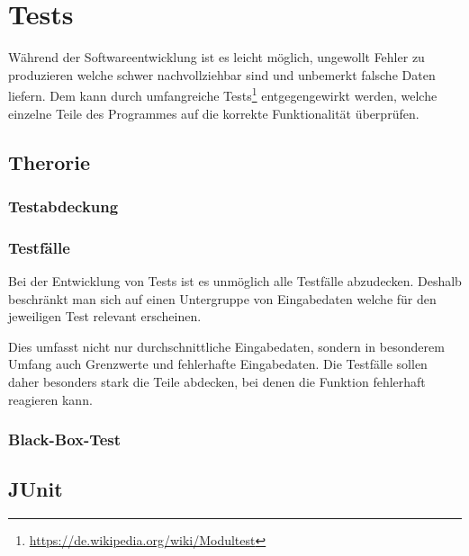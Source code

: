 

\section{Tests}

W\"ahrend der Softwareentwicklung ist es leicht m\"oglich, ungewollt Fehler zu produzieren welche schwer nachvollziehbar sind und unbemerkt falsche Daten liefern. Dem kann durch umfangreiche Tests\footnote{\url{https://de.wikipedia.org/wiki/Modultest}} entgegengewirkt werden, welche einzelne Teile des Programmes auf die korrekte Funktionalit\"at \"uberpr\"ufen.

\subsection{Therorie}

\subsubsection{Testabdeckung}

\subsubsection{Testf\"alle}

Bei der Entwicklung von Tests ist es unm\"oglich alle Testf\"alle abzudecken. Deshalb beschr\"ankt man sich auf einen Untergruppe von Eingabedaten welche f\"ur den jeweiligen Test relevant erscheinen.

Dies umfasst nicht nur durchschnittliche Eingabedaten, sondern in besonderem Umfang auch Grenzwerte und fehlerhafte Eingabedaten. Die Testf\"alle sollen daher besonders stark die Teile abdecken, bei denen die Funktion fehlerhaft reagieren kann.

\subsubsection{Black-Box-Test}

\newpage
\subsection{JUnit}

